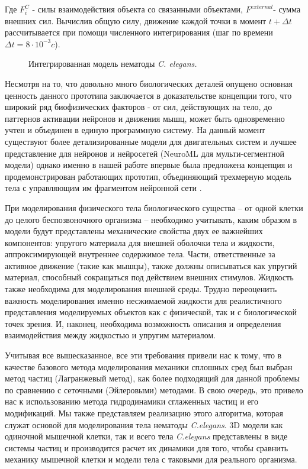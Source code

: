 Где \( F_{i}^C \) - силы взаимодействия объекта со связанными объектами, \( F^{external}  \)- сумма внешних сил. Вычислив общую силу, движение каждой точки в момент \( t + \Delta t \) рассчитывается при помощи численного интегрирования (шаг по времени \( \Delta t = 8 \cdot 10^{-3}c \)).

\begin{figure}[ht]
  \caption{Интегрированная модель нематоды \textit{C. elegans.}}\label{fig:cyber_elegans}
\end{figure}

Несмотря на то, что довольно много биологических деталей опущено основная ценность данного прототипа заключается в доказательстве концепции того, что широкий ряд биофизических факторов - от сил, действующих на тело, до паттернов активации нейронов и движения мышц, может быть одновременно учтен и объединен в единую программную систему. На данный момент существуют более детализированные модели для двигательных систем \cite{Boyle2012} и лучшее представление для нейронов и нейросетей (NeuroML \cite {Gleeson2010} для мульти-сегментной модели) однако именно в нашей работе впервые была предложена концепция и продемонстрирован работающих прототип, объединяющий трехмерную модель тела с управляющим им фрагментом нейронной сети \cite {Palyanov2012}.

При моделирования физического тела биологического существа – от одной клетки до целого беспозвоночного организма – необходимо учитывать, каким образом в модели будут представлены механические свойства двух ее важнейших компонентов: упругого материала для внешней оболочки тела и жидкости, аппроксимирующей внутреннее содержимое тела. Части, ответственные за активное движение (такие как мышцы), также должны описываться как упругий материал, способный сокращаться под действием внешних стимулов. Жидкость также необходима для моделирования внешней среды. Трудно переоценить важность моделирования именно несжимаемой жидкости для реалистичного представления моделируемых объектов как с физической, так и с биологической точек зрения. И, наконец, необходима возможность описания и определения  взаимодействия между жидкостью и упругим материалом.

Учитывая все вышесказанное, все эти требования привели нас к тому, что в качестве базового метода моделирования механики сплошных сред был выбран метод частиц (Лагранжевый метод), как более подходящий для данной проблемы по сравнению с сеточными (Эйлеровыми) методами.  В свою очередь, это привело нас к использованию метода гидродинамики сглаженных частиц и его модификаций. Мы также представляем реализацию этого алгоритма, которая служат основой для моделирования тела нематоды \textit{C.elegans}. 3D модели как одиночной мышечной клетки, так и всего тела \textit{C.elegans} представлены в виде системы частиц и производится расчет их динамики для того, чтобы сравнить  механику мышечной клетки и модели тела с таковыми для реального организма.

